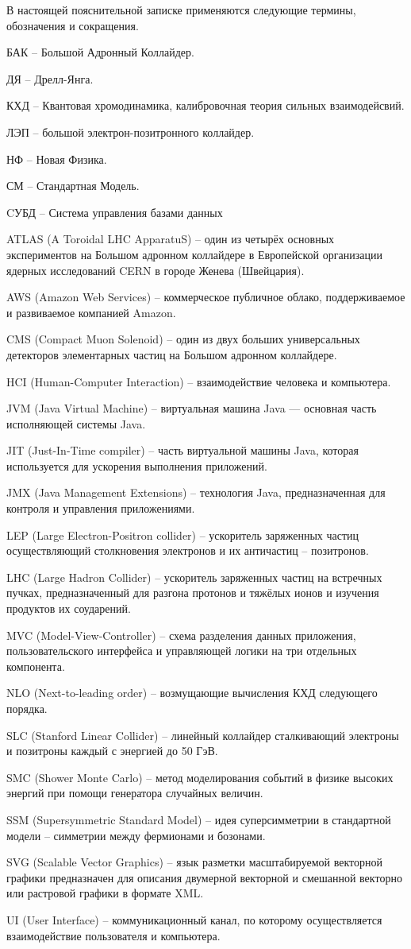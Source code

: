 В настоящей пояснительной записке применяются следующие термины, обозначения и сокращения.

БАК -- Большой Адронный Коллайдер.

ДЯ -- Дрелл-Янга.

КХД -- Квантовая хромодинамика, калибровочная теория сильных взаимодейсвий.

ЛЭП -- большой электрон-позитронного коллайдер.

НФ -- Новая Физика.

СМ -- Стандартная Модель.

CУБД -- Система управления базами данных

ATLAS (A Toroidal LHC ApparatuS) -- один из четырёх основных экспериментов на Большом адронном коллайдере в Европейской организации ядерных исследований CERN в городе Женева (Швейцария).

AWS (Amazon Web Services) -- коммерческое публичное облако, поддерживаемое и развиваемое компанией Amazon.

CMS (Compact Muon Solenoid) -- один из двух больших универсальных детекторов элементарных частиц на Большом адронном коллайдере.

HCI (Human-Computer Interaction) -- взаимодействие человека и компьютера.

JVM (Java Virtual Machine) -- виртуальная машина Java — основная часть исполняющей системы Java.

JIT (Just-In-Time compiler) -- часть виртуальной машины Java, которая используется для ускорения выполнения приложений.

JMX (Java Management Extensions) -- технология Java, предназначенная для контроля и управления приложениями.

LEP (Large Electron-Positron collider) -- ускоритель заряженных частиц осуществляющий столкновения электронов и их античастиц -- позитронов.

LHC (Large Hadron Collider) --  ускоритель заряженных частиц на встречных пучках, предназначенный для разгона протонов и тяжёлых ионов и изучения продуктов их соударений.

MVC (Model-View-Controller) -- схема разделения данных приложения, пользовательского интерфейса и управляющей логики на три отдельных компонента.

NLO (Next-to-leading order) -- возмущающие вычисления КХД следующего порядка.

SLC (Stanford Linear Collider) -- линейный коллайдер сталкивающий электроны и позитроны каждый с энергией до 50 ГэВ.

SMC (Shower Monte Carlo) -- метод моделирования событий в физике высоких энергий при помощи генератора случайных величин.

SSM (Supersymmetric Standard
Model) -- идея суперсимметрии в стандартной модели -- симметрии между фермионами и бозонами. 

SVG (Scalable Vector Graphics) -- язык разметки масштабируемой векторной графики предназначен для описания двумерной векторной и смешанной векторно или растровой графики в формате XML.

UI (User Interface) -- коммуникационный канал, по которому осуществляется взаимодействие пользователя и компьютера.

